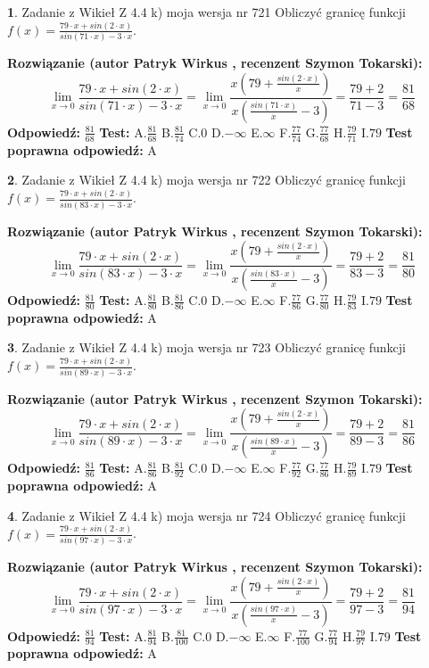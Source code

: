 \documentclass[12pt, a4paper]{article}
\theoremstyle{definition} %
\newtheorem{zad}{}
\newcommand{\zadStart}[1]{\begin{zad}#1\newline}
\newcommand{\zadStop}{\end{zad}}
\newcommand{\rozwStart}[2]{\noindent \textbf{Rozwiązanie (autor #1 , recenzent #2): }\newline}
\newcommand{\rozwStop}{\newline}
\newcommand{\odpStart}{\noindent \textbf{Odpowiedź:}\newline}
\newcommand{\odpStop}{\newline}
\newcommand{\testStart}{\noindent \textbf{Test:}\newline}
\newcommand{\testStop}{\newline}
\newcommand{\kluczStart}{\noindent \textbf{Test poprawna odpowiedź:}\newline}
\newcommand{\kluczStop}{\newline}
\begin{document}
\zadStart{Zadanie z Wikieł Z 4.4 k) moja wersja nr 721}
Obliczyć granicę funkcji $f(x)=\frac{79\cdot x +sin(2\cdot x)}{sin(71\cdot x) -3\cdot x}$.
\zadStop
\rozwStart{Patryk Wirkus}{Szymon Tokarski}
$$\lim\limits_{x\to 0}\frac{79\cdot x +sin(2\cdot x)}{sin(71\cdot x) -3\cdot x}
=\lim\limits_{x\to 0}\frac{x(79+\frac{sin(2\cdot x)}{x})}{x(\frac{sin(71\cdot x)}{x}-3)}
=\frac{79+2}{71-3} = \frac{81}{68}$$
\rozwStop
\odpStart
$\frac{81}{68}$
\odpStop
\testStart
A.$\frac{81}{68}$
B.$\frac{81}{74}$
C.$0$
D.$-\infty$
E.$\infty$
F.$\frac{77}{74}$
G.$\frac{77}{68}$
H.$\frac{79}{71}$
I.$79$
\testStop
\kluczStart
A
\kluczStop



\zadStart{Zadanie z Wikieł Z 4.4 k) moja wersja nr 722}
Obliczyć granicę funkcji $f(x)=\frac{79\cdot x +sin(2\cdot x)}{sin(83\cdot x) -3\cdot x}$.
\zadStop
\rozwStart{Patryk Wirkus}{Szymon Tokarski}
$$\lim\limits_{x\to 0}\frac{79\cdot x +sin(2\cdot x)}{sin(83\cdot x) -3\cdot x}
=\lim\limits_{x\to 0}\frac{x(79+\frac{sin(2\cdot x)}{x})}{x(\frac{sin(83\cdot x)}{x}-3)}
=\frac{79+2}{83-3} = \frac{81}{80}$$
\rozwStop
\odpStart
$\frac{81}{80}$
\odpStop
\testStart
A.$\frac{81}{80}$
B.$\frac{81}{86}$
C.$0$
D.$-\infty$
E.$\infty$
F.$\frac{77}{86}$
G.$\frac{77}{80}$
H.$\frac{79}{83}$
I.$79$
\testStop
\kluczStart
A
\kluczStop



\zadStart{Zadanie z Wikieł Z 4.4 k) moja wersja nr 723}
Obliczyć granicę funkcji $f(x)=\frac{79\cdot x +sin(2\cdot x)}{sin(89\cdot x) -3\cdot x}$.
\zadStop
\rozwStart{Patryk Wirkus}{Szymon Tokarski}
$$\lim\limits_{x\to 0}\frac{79\cdot x +sin(2\cdot x)}{sin(89\cdot x) -3\cdot x}
=\lim\limits_{x\to 0}\frac{x(79+\frac{sin(2\cdot x)}{x})}{x(\frac{sin(89\cdot x)}{x}-3)}
=\frac{79+2}{89-3} = \frac{81}{86}$$
\rozwStop
\odpStart
$\frac{81}{86}$
\odpStop
\testStart
A.$\frac{81}{86}$
B.$\frac{81}{92}$
C.$0$
D.$-\infty$
E.$\infty$
F.$\frac{77}{92}$
G.$\frac{77}{86}$
H.$\frac{79}{89}$
I.$79$
\testStop
\kluczStart
A
\kluczStop



\zadStart{Zadanie z Wikieł Z 4.4 k) moja wersja nr 724}
Obliczyć granicę funkcji $f(x)=\frac{79\cdot x +sin(2\cdot x)}{sin(97\cdot x) -3\cdot x}$.
\zadStop
\rozwStart{Patryk Wirkus}{Szymon Tokarski}
$$\lim\limits_{x\to 0}\frac{79\cdot x +sin(2\cdot x)}{sin(97\cdot x) -3\cdot x}
=\lim\limits_{x\to 0}\frac{x(79+\frac{sin(2\cdot x)}{x})}{x(\frac{sin(97\cdot x)}{x}-3)}
=\frac{79+2}{97-3} = \frac{81}{94}$$
\rozwStop
\odpStart
$\frac{81}{94}$
\odpStop
\testStart
A.$\frac{81}{94}$
B.$\frac{81}{100}$
C.$0$
D.$-\infty$
E.$\infty$
F.$\frac{77}{100}$
G.$\frac{77}{94}$
H.$\frac{79}{97}$
I.$79$
\testStop
\kluczStart
A
\kluczStop
\end{document}
